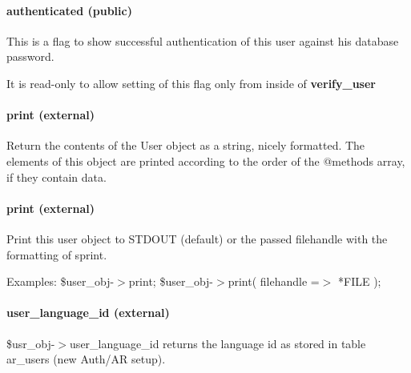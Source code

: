 \paragraph*{authenticated (public)\label{Apiis::DataBase::User_--_collecting_and_providing_user_data_authenticated_public_}}


This is a flag to show successful authentication of this user against his 
database password.



It is read-only to allow setting of this flag only from inside of \textbf{verify\_user}

\paragraph*{print (external)\label{Apiis::DataBase::User_--_collecting_and_providing_user_data_print_external_}}


Return the contents of the User object as a string, nicely formatted.
The elements of this object are printed according to the order of the @methods
array, if they contain data.

\paragraph*{print (external)\label{Apiis::DataBase::User_--_collecting_and_providing_user_data_print_external_}}


Print this user object to STDOUT (default) or the passed filehandle with the
formatting of sprint.



Examples:
  \$user\_obj-$>$print;
  \$user\_obj-$>$print( filehandle =$>$ *FILE );

\paragraph*{user\_language\_id (external)\label{Apiis::DataBase::User_--_collecting_and_providing_user_data_user_language_id_external_}}


\$usr\_obj-$>$user\_language\_id returns the language id as stored in table ar\_users
(new Auth/AR setup).

